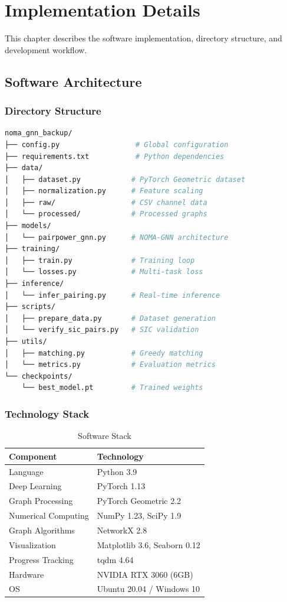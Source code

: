 \chapter{Implementation Details}
\label{chap:implementation}

This chapter describes the software implementation, directory structure, and development workflow.

\section{Software Architecture}

\subsection{Directory Structure}

\begin{lstlisting}[language=bash]
noma_gnn_backup/
├── config.py                  # Global configuration
├── requirements.txt           # Python dependencies
├── data/
│   ├── dataset.py            # PyTorch Geometric dataset
│   ├── normalization.py      # Feature scaling
│   ├── raw/                  # CSV channel data
│   └── processed/            # Processed graphs
├── models/
│   └── pairpower_gnn.py      # NOMA-GNN architecture
├── training/
│   ├── train.py              # Training loop
│   └── losses.py             # Multi-task loss
├── inference/
│   └── infer_pairing.py      # Real-time inference
├── scripts/
│   ├── prepare_data.py       # Dataset generation
│   └── verify_sic_pairs.py   # SIC validation
├── utils/
│   ├── matching.py           # Greedy matching
│   └── metrics.py            # Evaluation metrics
└── checkpoints/
    └── best_model.pt         # Trained weights
\end{lstlisting}

\subsection{Technology Stack}

\begin{table}[H]
\centering
\begin{tabular}{ll}
\toprule
\textbf{Component} & \textbf{Technology} \\
\midrule
Language & Python 3.9 \\
Deep Learning & PyTorch 1.13 \\
Graph Processing & PyTorch Geometric 2.2 \\
Numerical Computing & NumPy 1.23, SciPy 1.9 \\
Graph Algorithms & NetworkX 2.8 \\
Visualization & Matplotlib 3.6, Seaborn 0.12 \\
Progress Tracking & tqdm 4.64 \\
Hardware & NVIDIA RTX 3060 (6GB) \\
OS & Ubuntu 20.04 / Windows 10 \\
\bottomrule
\end{tabular}
\caption{Software Stack}
\end{table}

